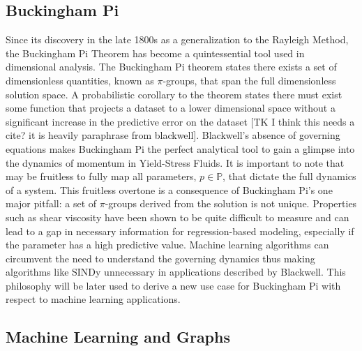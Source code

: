 \documentclass{article}
\begin{document}
\subsection{Buckingham Pi}
    
Since its discovery in the late 1800s as a generalization to the Rayleigh Method, the Buckingham Pi Theorem has become a quintessential tool used in dimensional analysis.  The Buckingham Pi theorem states there exists a set of dimensionless quantities, known as $\pi$-groups, that span the full dimensionless solution space.  A probabilistic corollary to the theorem states there must exist some function that projects a dataset to a lower dimensional space without a significant increase in the predictive error on the dataset [TK I think this needs a cite? it is heavily paraphrase from blackwell].  Blackwell's absence of governing equations makes Buckingham Pi the perfect analytical tool to gain a glimpse into the dynamics of momentum in Yield-Stress Fluids.  It is important to note that may be fruitless to fully map all parameters, $p \in \mathbb{P}$, that dictate the full dynamics of a system.  This fruitless overtone is a consequence of Buckingham Pi's one major pitfall: a set of $\pi$-groups derived from the solution is not unique.  Properties such as shear viscosity have been shown to be quite difficult to measure and can lead to a gap in necessary information for regression-based modeling, especially if the parameter has a high predictive value.  Machine learning algorithms can circumvent the need to understand the governing dynamics thus making algorithms like SINDy unnecessary in applications described by Blackwell. This philosophy will be later used to derive a new use case for Buckingham Pi with respect to machine learning applications.

\subsection{Machine Learning and Graphs}
\end{document}
